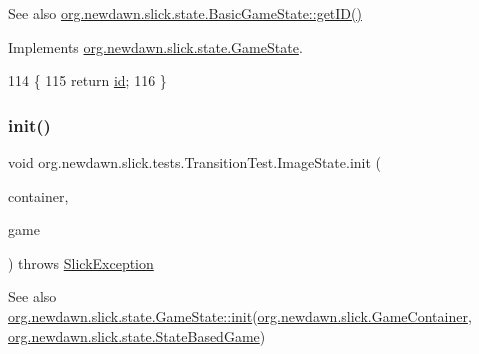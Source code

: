 \begin{DoxySeeAlso}{See also}
\mbox{\hyperlink{classorg_1_1newdawn_1_1slick_1_1state_1_1_basic_game_state_a781ce2b3d6dd9b9853adb011f5e75cf7}{org.\+newdawn.\+slick.\+state.\+Basic\+Game\+State\+::get\+I\+D()}} 
\end{DoxySeeAlso}


Implements \mbox{\hyperlink{interfaceorg_1_1newdawn_1_1slick_1_1state_1_1_game_state_a54f2bc6a91feaf0614a5ef19f1d03313}{org.\+newdawn.\+slick.\+state.\+Game\+State}}.


\begin{DoxyCode}
114                            \{
115             \textcolor{keywordflow}{return} \mbox{\hyperlink{classorg_1_1newdawn_1_1slick_1_1tests_1_1_transition_test_1_1_image_state_a4160846ad41a9f74b96e40e7f4a15237}{id}};
116         \}
\end{DoxyCode}
\mbox{\label{classorg_1_1newdawn_1_1slick_1_1tests_1_1_transition_test_1_1_image_state_a34a3137ea1f75dbcb0ebfa2ee40bb13f}} 
\subsubsection{\texorpdfstring{init()}{init()}}
{\footnotesize\ttfamily void org.\+newdawn.\+slick.\+tests.\+Transition\+Test.\+Image\+State.\+init (\begin{DoxyParamCaption}\item[{\mbox{\hyperlink{classorg_1_1newdawn_1_1slick_1_1_game_container}{Game\+Container}}}]{container,  }\item[{\mbox{\hyperlink{classorg_1_1newdawn_1_1slick_1_1state_1_1_state_based_game}{State\+Based\+Game}}}]{game }\end{DoxyParamCaption}) throws \mbox{\hyperlink{classorg_1_1newdawn_1_1slick_1_1_slick_exception}{Slick\+Exception}}\hspace{0.3cm}{\ttfamily [inline]}}

\begin{DoxySeeAlso}{See also}
\mbox{\hyperlink{interfaceorg_1_1newdawn_1_1slick_1_1state_1_1_game_state_aa799a369e0fcfe6822d2d586fa6f5bbc}{org.\+newdawn.\+slick.\+state.\+Game\+State\+::init}}(\mbox{\hyperlink{classorg_1_1newdawn_1_1slick_1_1_game_container}{org.\+newdawn.\+slick.\+Game\+Container}}, \mbox{\hyperlink{classorg_1_1newdawn_1_1slick_1_1state_1_1_state_based_game}{org.\+newdawn.\+slick.\+state.\+State\+Based\+Game}}) 
\end{DoxySeeAlso}


